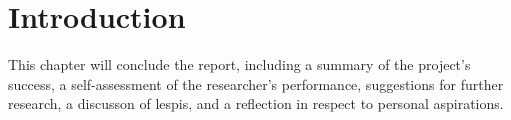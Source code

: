 \section{Introduction}
\label{sec:conclusion-introduction}

This chapter will conclude the report, including a summary of the project's success, a self-assessment of the researcher's performance, suggestions for further research, a discusson of \acp{lespi}, and a reflection in respect to personal aspirations.

